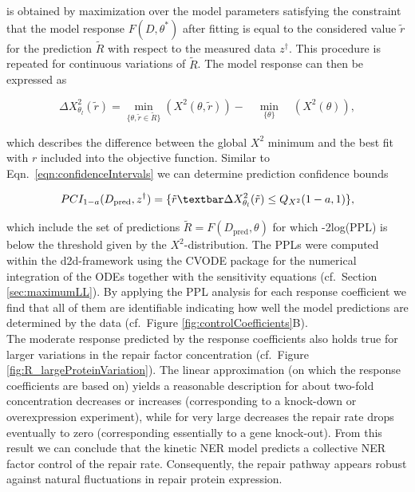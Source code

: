 is obtained by maximization over the model parameters satisfying the constraint that the model response $F(D, \theta^\ast)$ after fitting is equal to the considered value $\tilde{r}$ for the prediction $\tilde{R}$ with respect to the measured data $z^\dag$. This procedure is repeated for continuous variations of $\tilde{R}$. The model response can then be expressed as 

\begin{equation}
\Delta X_{\theta_l}^2(\tilde{r}) = \min_{\{\theta, \tilde{r} \in \tilde{R}  \}} \left( X^2 (\theta,\tilde{r} )\right)
- \quad  \min_{\{\theta\}} \quad  \left( X^2 (\theta)\right),
\end{equation}

which describes the difference between the global $X^2$ minimum and the best fit with $r$ included into the objective function. Similar to Eqn.\ \ref{eqn:confidenceIntervals} we can determine prediction confidence bounds 

\begin{equation}
PCI_{1-a}(D_{\text{pred}},z^\dag) = \{\tilde{r}\textbar \Delta X_{\theta_l}^2(\tilde{r})\leq Q_{X^2}(1-a,1)\},
\label{eqn:confidenceIntervalsPPL}
\end{equation}

which include the set of predictions $\tilde{R} = F(D_{\text{pred}},\theta)$ for which -2log(PPL) is below the threshold given by the $X^2$-distribution. The PPLs were computed within the d2d-framework \cite{Raue2013} using the CVODE package \cite{Hindmarsh2005} for the numerical integration of the ODEs together with the sensitivity equations (cf.\ Section \ref{sec:maximumLL}).
By applying the PPL analysis for each response coefficient we find that all of them are identifiable indicating how well the model predictions are determined by the data (cf.\ Figure \ref{fig:controlCoefficients}B).\\ The moderate response predicted by the response coefficients also holds true for larger variations in the repair factor concentration (cf.\ Figure \ref{fig:R_largeProteinVariation}). The linear approximation (on which the response coefficients are based on) yields a reasonable description for about two-fold concentration decreases or increases (corresponding to a knock-down or overexpression experiment), while for very large decreases the repair rate drops eventually to zero (corresponding essentially to a gene knock-out). From this result we can conclude that the kinetic NER model predicts a collective NER factor control of the repair rate. Consequently, the repair pathway appears robust against natural fluctuations in repair protein expression.  


